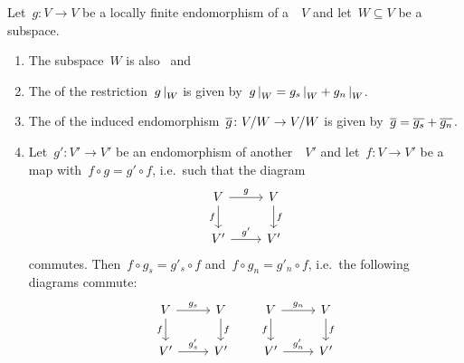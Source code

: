 \begin{lemma}
  \label{properties of local jcd}
  Let~$g \colon V \to V$ be a locally finite endomorphism of a~~$V$ and let~$W \subseteq V$ be a~ subspace.
  \begin{enumerate}
    \item
      The subspace~$W$ is also~ and~
    \item
      \label{restriction of local jcd}
      The {\JCD} of the restriction~$\restrict{g}{W}$ is given by~$\restrict{g}{W} = \restrict{g_s}{W} + \restrict{g_n}{W}$.
    \item
      \label{induced local jcd}
      The {\JCD} of the induced endomorphism~$\overline{g} \colon V/W \to V/W$ is given by~$\overline{g} = \overline{g_s} + \overline{g_n}$.
    \item
      Let~$g' \colon V' \to V'$ be an endomorphism of another~~$V'$ and let~$f \colon V \to V'$ be a~ map with~$f \circ g = g' \circ f$, i.e.\ such that the diagram
      \[
        \begin{tikzcd}
            V
            \arrow{r}[above]{g}
            \arrow{d}[left]{f}
          & V
            \arrow{d}[right]{f}
          \\
            V'
            \arrow{r}[above]{g'}
          & V'
        \end{tikzcd}
      \]
      commutes.
      Then~$f \circ g_s = g'_s \circ f$ and~$f \circ g_n = g'_n \circ f$, i.e.\ the following diagrams commute:
      \[
        \begin{tikzcd}
            V
            \arrow{r}[above]{g_s}
            \arrow{d}[left]{f}
          & V
            \arrow{d}[right]{f}
          \\
            V'
            \arrow{r}[above]{g'_s}
          & V'
        \end{tikzcd}
        \qquad
        \begin{tikzcd}
            V
            \arrow{r}[above]{g_n}
            \arrow{d}[left]{f}
          & V
            \arrow{d}[right]{f}
          \\
            V'
            \arrow{r}[above]{g'_n}
          & V'
        \end{tikzcd}
      \]
  \end{enumerate}
\end{lemma}


